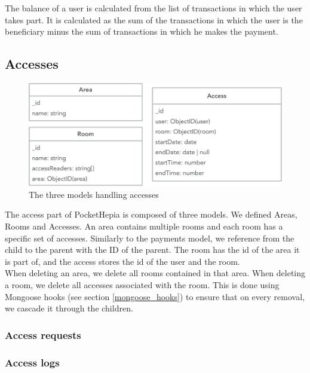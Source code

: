 \documentclass[11pt,a4paper]{report}
\begin{document}
The balance of a user is calculated from the list of transactions in which the user takes part. It is calculated as the sum of the transactions in which the user is the beneficiary minus the sum of transactions in which he makes the payment.
\subsection{Accesses}
\begin{figure}[H]
\begin{center}
	\includegraphics[width=.8\textwidth]{assets/access_model}
	\caption{The three models handling accesses}
\end{center}
\end{figure}

The access part of PocketHepia is composed of three models. We defined Areas, Rooms and Accesses. An area contains multiple rooms and each room has a specific set of accesses. Similarly to the payments model, we reference from the child to the parent with the ID of the parent. The room has the id of the area it is part of, and the access stores the id of the user and the room. \\

When deleting an area, we delete all rooms contained in that area. When deleting a room, we delete all accesses associated with the room. This is done using Mongoose hooks (see section \ref{mongoose_hooks}) to ensure that on every removal, we cascade it through the children.
\subsubsection{Access requests}
\subsubsection{Access logs}
\end{document}
